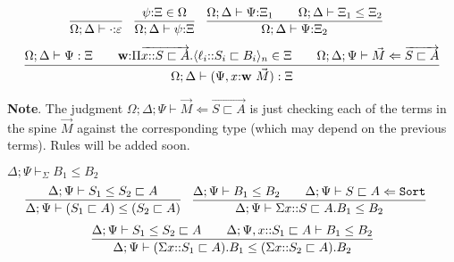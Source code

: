 \documentclass[letterpaper, 11pt]{article}
\newcommand{\Lar}{\Leftarrow}
\newcommand{\Sort}{\texttt{Sort}}
\begin{document}
    \begin{align*}
      & \infer{\Omega; \Delta \vdash \cdot {:} \varepsilon}{} &
      & \infer{\Omega; \Delta \vdash \psi {:} \Xi}{\psi {:} \Xi \in \Omega} &
      & \infer{\Omega; \Delta \vdash \Psi {:} \Xi_2}
        {
          \Omega; \Delta \vdash \Psi {:} \Xi_1
          &&
          \Omega; \Delta \vdash \Xi_1 \leq \Xi_2
        }
    \end{align*}
    \begin{align*}
      \infer{\Omega; \Delta \vdash (\Psi, x{:} \textbf{w} \ \vec{M}) : \Xi}
            {
              \Omega; \Delta \vdash \Psi : \Xi
              &&
              \textbf{w} {:} \Pi \overrightarrow{x{::}S \sqsubset A}. \langle \ell_i {::} S_i \sqsubset B_i \rangle_n \in \Xi
              &&
              \Omega ; \Delta; \Psi \vdash \vec{M} \Lar \overrightarrow{S \sqsubset A}
            }
    \end{align*}

    \textbf{Note}. The judgment $\Omega; \Delta; \Psi \vdash \vec{M} \Lar \overrightarrow{S \sqsubset A}$ is just checking each of the terms in the 
    spine $\vec{M}$ against the corresponding type (which may depend on the previous terms).  Rules will be added soon.

    $\boxed{\Delta; \Psi \vdash_\Sigma B_1 \leq B_2}$
    \begin{align*}
      & \infer{\Delta; \Psi \vdash (S_1 \sqsubset A) \leq (S_2 \sqsubset A)}
              {
                \Delta; \Psi \vdash S_1 \leq S_2 \sqsubset A
              } &
      & \infer{\Delta; \Psi \vdash \Sigma x{::}S \sqsubset A. B_1 \leq B_2}
              {
                \Delta ; \Psi \vdash B_1 \leq B_2
                &&
                \Delta; \Psi \vdash S \sqsubset A \Lar \Sort
              }
    \end{align*}
    \begin{align*}
      \infer{\Delta; \Psi \vdash (\Sigma x{::} S_1 \sqsubset A).B_1 \leq (\Sigma x{::}S_2 \sqsubset A). B_2 }
            {
              \Delta; \Psi \vdash S_1 \leq S_2 \sqsubset A
              &&
              \Delta; \Psi, x{::}S_1 \sqsubset A \vdash B_1 \leq B_2
            }
    \end{align*}
\end{document}
